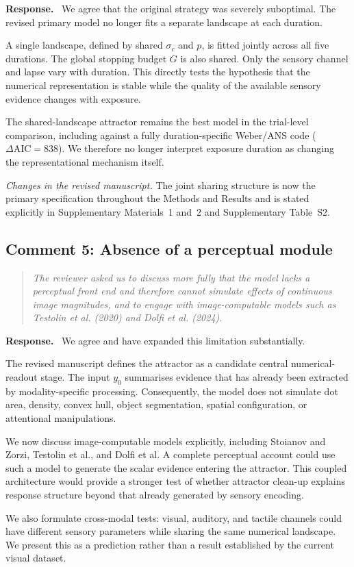 \documentclass[11pt]{article}
\newenvironment{reviewercomment}{\begin{quote}\color{reviewgray}\itshape}{\end{quote}}
\newenvironment{authorresponse}{\par\noindent\textbf{\color{responseblue}Response.}\ }{\par}
\newcommand{\change}[1]{\par\noindent\textit{Changes in the revised manuscript.} #1\par}
\begin{document}
\begin{authorresponse}
We agree that the original strategy was severely suboptimal. The revised primary model no longer fits a separate landscape at each duration.

A single landscape, defined by shared $\sigma_c$ and $p$, is fitted jointly across all five durations. The global stopping budget $G$ is also shared. Only the sensory channel and lapse vary with duration. This directly tests the hypothesis that the numerical representation is stable while the quality of the available sensory evidence changes with exposure.

The shared-landscape attractor remains the best model in the trial-level comparison, including against a fully duration-specific Weber/ANS code ($\Delta\mathrm{AIC}=838$). We therefore no longer interpret exposure duration as changing the representational mechanism itself.
\end{authorresponse}

\change{The joint sharing structure is now the primary specification throughout the Methods and Results and is stated explicitly in Supplementary Materials~1 and~2 and Supplementary Table~S2.}

\subsection*{Comment 5: Absence of a perceptual module}

\begin{reviewercomment}
The reviewer asked us to discuss more fully that the model lacks a perceptual front end and therefore cannot simulate effects of continuous image magnitudes, and to engage with image-computable models such as Testolin et al. (2020) and Dolfi et al. (2024).
\end{reviewercomment}

\begin{authorresponse}
We agree and have expanded this limitation substantially.

The revised manuscript defines the attractor as a candidate central numerical-readout stage. The input $y_0$ summarises evidence that has already been extracted by modality-specific processing. Consequently, the model does not simulate dot area, density, convex hull, object segmentation, spatial configuration, or attentional manipulations.

We now discuss image-computable models explicitly, including Stoianov and Zorzi, Testolin et al., and Dolfi et al. A complete perceptual account could use such a model to generate the scalar evidence entering the attractor. This coupled architecture would provide a stronger test of whether attractor clean-up explains response structure beyond that already generated by sensory encoding.

We also formulate cross-modal tests: visual, auditory, and tactile channels could have different sensory parameters while sharing the same numerical landscape. We present this as a prediction rather than a result established by the current visual dataset.
\end{authorresponse}
\end{document}
